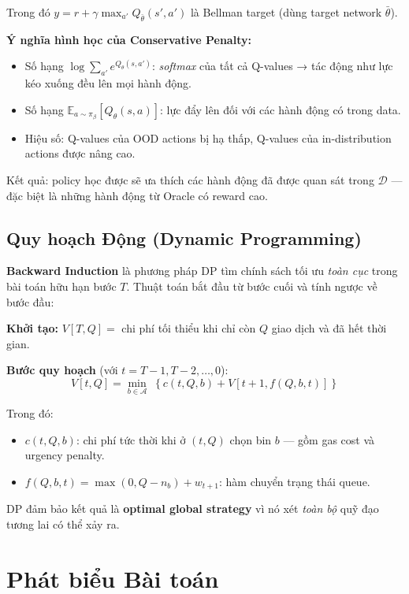 Trong đó $y = r + \gamma \max_{a'} Q_{\bar\theta}(s', a')$ là Bellman target (dùng target network $\bar\theta$).

\textbf{Ý nghĩa hình học của Conservative Penalty:}
\begin{itemize}
    \item Số hạng $\log\sum_{a'} e^{Q_\theta(s,a')}$: \textit{softmax} của tất cả Q-values → tác động như lực kéo xuống đều lên mọi hành động.
    \item Số hạng $\mathbb{E}_{a\sim\pi_\beta}[Q_\theta(s,a)]$: lực đẩy lên đối với các hành động có trong data.
    \item Hiệu số: Q-values của OOD actions bị hạ thấp, Q-values của in-distribution actions được nâng cao.
\end{itemize}

Kết quả: policy học được sẽ ưa thích các hành động đã được quan sát trong $\mathcal{D}$ — đặc biệt là những hành động từ Oracle có reward cao.

\subsection{Quy hoạch Động (Dynamic Programming)}

\textbf{Backward Induction} là phương pháp DP tìm chính sách tối ưu \textit{toàn cục} trong bài toán hữu hạn bước $T$. Thuật toán bắt đầu từ bước cuối và tính ngược về bước đầu:

\textbf{Khởi tạo:} $V[T, Q] = $ chi phí tối thiểu khi chỉ còn $Q$ giao dịch và đã hết thời gian.

\textbf{Bước quy hoạch} (với $t = T-1, T-2, \ldots, 0$):
\begin{equation}
    V[t, Q] = \min_{b \in \mathcal{A}}\; \left\{c(t, Q, b) + V[t+1, f(Q, b, t)]\right\}
    \label{eq:dp}
\end{equation}

Trong đó:
\begin{itemize}
    \item $c(t, Q, b)$: chi phí tức thời khi ở $(t, Q)$ chọn bin $b$ — gồm gas cost và urgency penalty.
    \item $f(Q, b, t) = \max(0, Q - n_b) + w_{t+1}$: hàm chuyển trạng thái queue.
\end{itemize}

DP đảm bảo kết quả là \textbf{optimal global strategy} vì nó xét \textit{toàn bộ} quỹ đạo tương lai có thể xảy ra.

\section{Phát biểu Bài toán}

